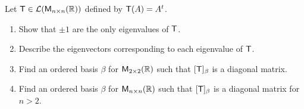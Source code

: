 \begin{ex}\label{ex:5.1.17}
  Let \(\T \in \ls(\ms[n][n][\R])\) defined by \(\mathsf{T}(A) = {A}^{t}\).
  \begin{enumerate}
    \item Show that \(\pm 1\) are the only eigenvalues of \(\mathsf{T}\).
    \item Describe the eigenvectors corresponding to each eigenvalue of \(\mathsf{T}\).
    \item Find an ordered basis \(\beta\) for \(\ms[2][2][\R]\) such that \([\mathsf{T}]_{\beta}\) is a diagonal matrix.
    \item Find an ordered basis \(\beta\) for \(\ms[n][n][\R]\) such that \([\mathsf{T}]_{\beta}\) is a diagonal matrix for \(n > 2\).
  \end{enumerate}
\end{ex}

